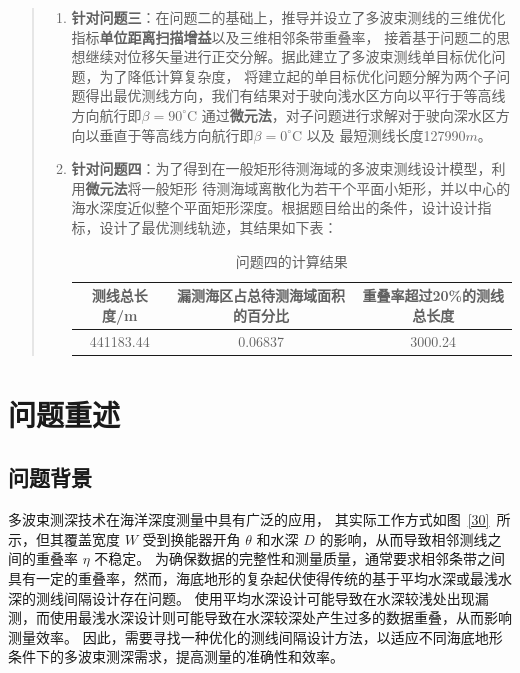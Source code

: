 \documentclass[withoutpreface,bwprint]{cumcmthesis} %
\begin{document}
\begin{abstract}
\begin{enumerate}
        \item \textbf{针对问题三}：在问题二的基础上，推导并设立了多波束测线的三维优化指标\textbf{单位距离扫描增益}以及三维相邻条带重叠率，
        接着基于问题二的思想继续对位移矢量进行正交分解。据此建立了多波束测线单目标优化问题，为了降低计算复杂度，
        将建立起的单目标优化问题分解为两个子问题得出最优测线方向，我们有结果对于驶向浅水区方向以平行于等高线方向航行即$
        \beta=90^{\circ} \mathrm{C}$ 通过\textbf{微元法}，对子问题进行求解对于驶向深水区方向以垂直于等高线方向航行即$\beta=0^{\circ} \mathrm{C}$ 
        以及 最短测线长度127990$m$。
        
        
        
        
        
        \item \textbf{针对问题四}：为了得到在一般矩形待测海域的多波束测线设计模型，利用\textbf{微元法}将一般矩形
        待测海域离散化为若干个平面小矩形，并以中心的海水深度近似整个平面矩形深度。根据题目给出的条件，设计设计指标，设计了最优测线轨迹，其结果如下表：
        
        \begin{table}[!htbp]
        \caption{问题四的计算结果} 
        \centering
        \begin{tabular}{ccc}
            \toprule[2pt]
            测线总长度/m & 漏测海区占总待测海域面积的百分比 & 重叠率超过20\%的测线总长度 \\
            \midrule[1pt]
            441183.44 & 0.06837 & 3000.24\\
            \bottomrule[2pt]
        \end{tabular}
    \end{table}
     
    \end{enumerate}
\end{abstract}

    \section{问题重述}
    \subsection{问题背景}
    多波束测深技术在海洋深度测量中具有广泛的应用， 其实际工作方式如图~\ref{30}~所示，但其覆盖宽度 $W$ 受到换能器开角 $\theta$ 和水深 $D$ 的影响，从而导致相邻测线之间的重叠率 $\eta$ 不稳定。
    为确保数据的完整性和测量质量，通常要求相邻条带之间具有一定的重叠率，然而，海底地形的复杂起伏使得传统的基于平均水深或最浅水深的测线间隔设计存在问题。
    使用平均水深设计可能导致在水深较浅处出现漏测，而使用最浅水深设计则可能导致在水深较深处产生过多的数据重叠，从而影响测量效率。
    因此，需要寻找一种优化的测线间隔设计方法，以适应不同海底地形条件下的多波束测深需求，提高测量的准确性和效率。
\end{document}
